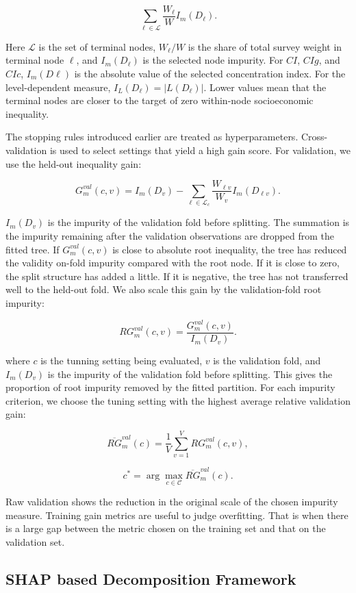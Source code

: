\documentclass[
  11pt,
  a4paper,
]{article}
\begin{document}
\[
\sum_{\ell \in \mathcal{L}}
\frac{W_\ell}{W} I_m(D_\ell).
\]

Here \(\mathcal{L}\) is the set of terminal nodes, \(W_\ell/W\) is the
share of total survey weight in terminal node \(\ell\), and
\(I_m(D_\ell)\) is the selected node impurity. For \(CI\), \(CIg\), and
\(CIc\), \(I_m(D \ell)\) is the absolute value of the selected
concentration index. For the level-dependent measure,
\(I_L(D_\ell)=|L(D_\ell)|\). Lower values mean that the terminal nodes
are closer to the target of zero within-node socioeconomic inequality.

The stopping rules introduced earlier are treated as hyperparameters.
Cross-validation is used to select settings that yield a high gain
score. For validation, we use the held-out inequality gain:

\[
G_m^{val}(c,v)
=
I_m(D_v)
-
\sum_{\ell \in \mathcal{L}_c}
\frac{W_{\ell v}}{W_v} I_m(D_{\ell v}).
\]

\(I_m(D_v)\) is the impurity of the validation fold before splitting.
The summation is the impurity remaining after the validation
observations are dropped from the fitted tree. If \(G_m^{val}(c,v)\) is
close to absolute root inequality, the tree has reduced the validity
on-fold impurity compared with the root node. If it is close to zero,
the split structure has added a little. If it is negative, the tree has
not transferred well to the held-out fold. We also scale this gain by
the validation-fold root impurity:

\[
RG_m^{val}(c,v)
=
\frac{G_m^{val}(c,v)}{I_m(D_v)}.
\]

where \(c\) is the tunning setting being evaluated, \(v\) is the
validation fold, and \(I_m(D_v)\) is the impurity of the validation fold
before splitting. This gives the proportion of root impurity removed by
the fitted partition. For each impurity criterion, we choose the tuning
setting with the highest average relative validation gain:

\[
\overline{RG}_m^{val}(c)
=
\frac{1}{V}
\sum_{v=1}^{V} RG_m^{val}(c,v),
\]

\[
c^*
=
\arg\max_{c \in \mathcal{C}}
\overline{RG}_m^{val}(c).
\]

Raw validation shows the reduction in the original scale of the chosen
impurity measure. Training gain metrics are useful to judge overfitting.
That is when there is a large gap between the metric chosen on the
training set and that on the validation set.

\subsection{SHAP based Decomposition
Framework}\label{sec-tree-based-decomposition}
\end{document}
